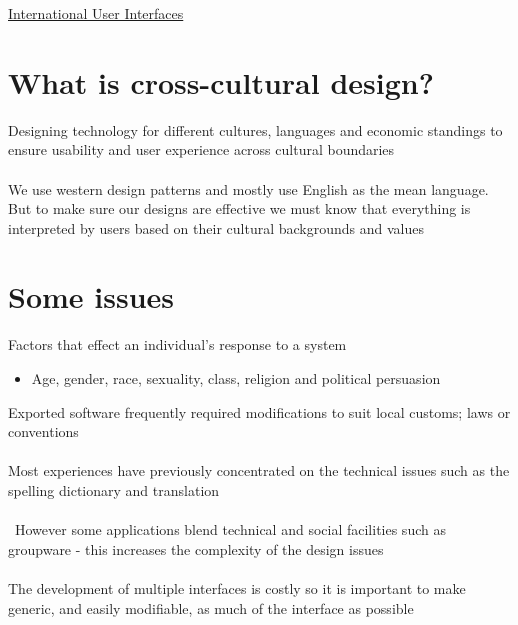 \documentclass{article}[18pt]
\begin{document}
\begin{center}
\underline{\huge International User Interfaces}
\end{center}
\section{What is cross-cultural design?}
Designing technology for different cultures, languages and economic standings to ensure usability and user experience across cultural boundaries\\
\\
We use western design patterns and mostly use English as the mean language. But to make sure our designs are effective we must know that everything is interpreted by users based on their cultural backgrounds and values
\section{Some issues}
Factors that effect an individual's response to a system
\begin{itemize}
	\item Age, gender, race, sexuality, class, religion and political persuasion
\end{itemize}
Exported software frequently required modifications to suit local customs; laws or conventions\\
\\
Most experiences have previously concentrated on the technical issues such as the spelling dictionary and translation\\\\\
However some applications blend technical and social facilities such as groupware - this increases the complexity of the design issues\\
\\
The development of multiple interfaces is costly so it is important to make generic, and easily modifiable, as much of the interface as possible
\end{document}
